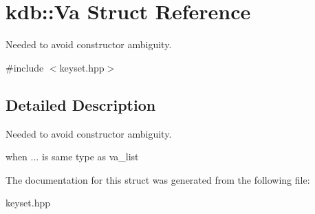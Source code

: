 \hypertarget{structkdb_1_1Va}{\section{kdb\+:\+:Va Struct Reference}
\label{structkdb_1_1Va}
}


Needed to avoid constructor ambiguity.  




{\ttfamily \#include $<$keyset.\+hpp$>$}



\subsection{Detailed Description}
Needed to avoid constructor ambiguity. 

when ... is same type as va\+\_\+list 

The documentation for this struct was generated from the following file\+:\begin{DoxyCompactItemize}
\item 
keyset.\+hpp\end{DoxyCompactItemize}
